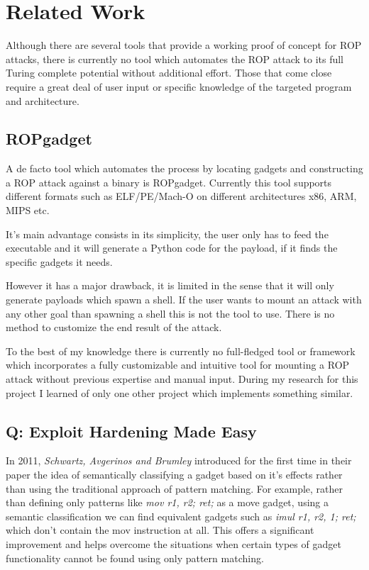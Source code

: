 \chapter{Related Work}
\label{chapter:relatedwork}

Although there are several tools that provide a working proof of concept for ROP attacks, there is currently no tool which automates the ROP attack to its full Turing complete potential without additional effort. Those that come close require a great deal of user input or specific knowledge of the targeted program and architecture.

\section{ROPgadget}

A de facto tool which automates the process by locating gadgets and constructing a ROP attack against a
binary is ROPgadget\cite{salwan2011ropgadget}. Currently this tool supports different formats such as ELF/PE/Mach-O on different architectures x86, ARM, MIPS etc.

It's main advantage consists in its simplicity, the user only has to feed the executable and it will generate a Python code for the payload, if it finds the specific gadgets it needs.

However it has a major drawback, it is limited in the sense that it will only generate payloads which spawn a shell. If the user wants to mount an attack with any other goal than spawning a shell this is not the tool to use. There is no method to customize the end result of the attack.

To the best of my knowledge there is currently no full-fledged tool or framework which incorporates a fully customizable and intuitive tool for mounting a ROP attack without previous expertise and manual input.
During my research for this project I learned of only one other project which implements something similar.

\section{Q: Exploit Hardening Made Easy}

In 2011, \textit{Schwartz, Avgerinos and Brumley} introduced for the first time in their paper\cite{schwartz2011q} the idea of semantically classifying a gadget based on it's effects rather than using the traditional approach of pattern matching. For example, rather than defining only patterns like \textit{mov r1, r2; ret;} as a move gadget, using a semantic classification we can find equivalent gadgets such as \textit{imul r1, r2, 1; ret;} which don't contain the mov instruction at all. This offers a significant improvement and helps overcome the situations when certain types of gadget functionality cannot be found using only pattern matching.

